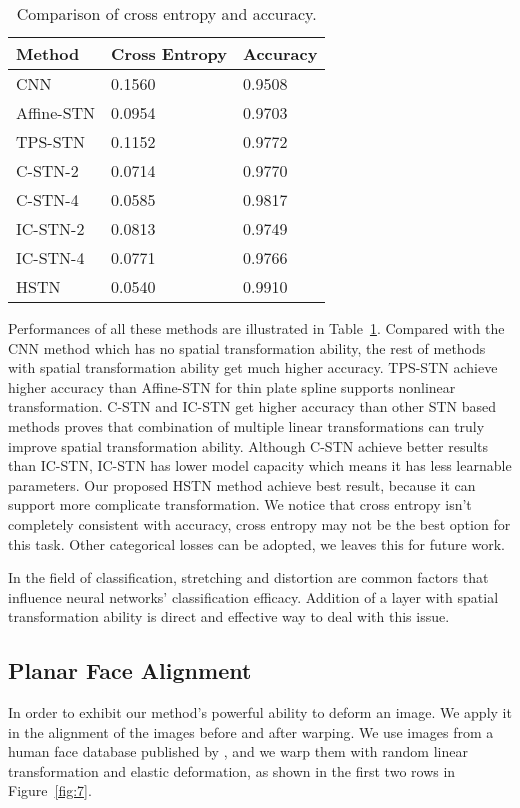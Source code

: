 \documentclass{article}
\begin{document}
\begin{table}[t]
  \centering
  \caption{Comparison of cross entropy and accuracy.}
    \begin{tabular}{p{2.5cm}<{\centering}|p{2.5cm}<{\centering}|p{2.5cm}<{\centering}}
    \hline
    Method & Cross Entropy & Accuracy  \\
    \hline
    CNN          & 0.1560  & 0.9508 \\
    Affine-STN   & 0.0954  & 0.9703 \\
    TPS-STN      & 0.1152  & 0.9772 \\
    C-STN-2      & 0.0714  & 0.9770 \\
    C-STN-4      & 0.0585  & 0.9817 \\
    IC-STN-2     & 0.0813  & 0.9749 \\
    IC-STN-4     & 0.0771  & 0.9766 \\
    \hline
    HSTN          & 0.0540  & 0.9910 \\
    \hline
    \end{tabular}%
  \label{tab:1}%
\end{table}%

Performances of all these methods are illustrated in Table~\ref{tab:1}.
Compared with the CNN method which has no spatial transformation ability, the rest of methods with spatial transformation ability get much higher accuracy.
TPS-STN achieve higher accuracy than Affine-STN for thin plate spline supports nonlinear transformation.
C-STN and IC-STN get higher accuracy than other STN based methods proves that combination of multiple linear transformations can truly improve spatial transformation ability.
Although C-STN achieve better results than IC-STN, IC-STN has lower model capacity which means it has less learnable parameters.
Our proposed HSTN method achieve best result, because it can support more complicate transformation.
We notice that cross entropy isn't completely consistent with accuracy, cross entropy may not be the best option for this task.
Other categorical losses can be adopted, we leaves this for future work.

In the field of classification, stretching and distortion are common factors that influence neural networks' classification efficacy.
Addition of a layer with spatial transformation ability is direct and effective way to deal with this issue.

\subsection{Planar Face Alignment}
In order to exhibit our method's powerful ability to deform an image.
We apply it in the alignment of the images before and after warping.
We use images from a human face database published by \cite{Peng2012RASL}, and we warp them with random linear transformation and elastic deformation, as shown in the first two rows in Figure~\ref{fig:7}.
\end{document}
